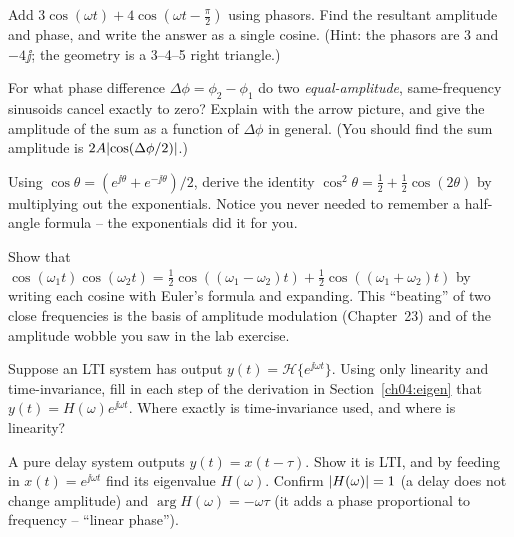 \begin{exercise}
Add $3\cos(\omega t) + 4\cos(\omega t - \tfrac{\pi}{2})$ using phasors. Find the resultant
amplitude and phase, and write the answer as a single cosine. (Hint: the phasors are $3$ and
$-4\jj$; the geometry is a 3--4--5 right triangle.)
\end{exercise}

\begin{exercise}
For what phase difference $\Delta\phi = \phi_2 - \phi_1$ do two \emph{equal-amplitude},
same-frequency sinusoids cancel exactly to zero? Explain with the arrow picture, and give the
amplitude of the sum as a function of $\Delta\phi$ in general. (You should find the sum amplitude
is $2A\lvert\cos(\Delta\phi/2)\rvert$.)
\end{exercise}

\begin{exercise}
Using $\cos\theta = (e^{\jj\theta} + e^{-\jj\theta})/2$, derive the identity
$\cos^2\theta = \tfrac12 + \tfrac12\cos(2\theta)$ by multiplying out the exponentials. Notice you
never needed to remember a half-angle formula -- the exponentials did it for you.
\end{exercise}

\begin{exercise}
Show that $\cos(\omega_1 t)\cos(\omega_2 t) = \tfrac12\cos((\omega_1-\omega_2)t) +
\tfrac12\cos((\omega_1+\omega_2)t)$ by writing each cosine with Euler's formula and expanding. This
``beating'' of two close frequencies is the basis of amplitude modulation (Chapter~23) and of the
amplitude wobble you saw in the lab exercise.
\end{exercise}

\begin{exercise}
Suppose an LTI system has output $y(t) = \mathcal{H}\{e^{\jj\omega t}\}$. Using only linearity and
time-invariance, fill in each step of the derivation in Section~\ref{ch04:eigen} that
$y(t) = H(\omega)e^{\jj\omega t}$. Where exactly is time-invariance used, and where is linearity?
\end{exercise}

\begin{exercise}
A pure delay system outputs $y(t) = x(t - \tau)$. Show it is LTI, and by feeding in
$x(t) = e^{\jj\omega t}$ find its eigenvalue $H(\omega)$. Confirm $\lvert H(\omega)\rvert = 1$ (a delay
does not change amplitude) and $\arg H(\omega) = -\omega\tau$ (it adds a phase proportional to
frequency -- ``linear phase'').
\end{exercise}


